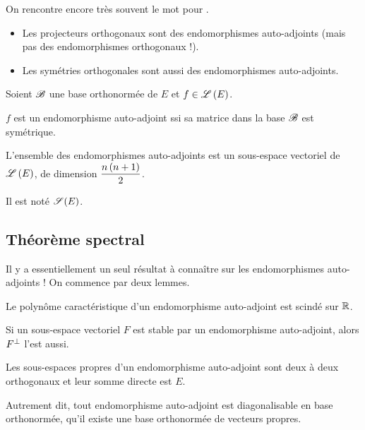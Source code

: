 On rencontre encore très souvent le mot  pour .

\begin{ex}
\begin{itemize}
    \item Les projecteurs orthogonaux sont des endomorphismes auto-adjoints (mais pas des endomorphismes orthogonaux !). \\
    \item Les symétries orthogonales sont aussi des endomorphismes auto-adjoints.
\end{itemize}
\end{ex}

\begin{prop}
Soient \(\mathscr{B}\) une base orthonormée de \(E\) et \(f\in\mathscr{L}\left(E\right)\).

\(f\) est un endomorphisme auto-adjoint ssi sa matrice dans la base \(\mathscr{B}\) est symétrique.
\end{prop}

\begin{cor}
L'ensemble des endomorphismes auto-adjoints est un sous-espace vectoriel de \(\mathscr{L}\left(E\right)\), de dimension \(\dfrac{n\left(n+1\right)}{2}\).
\end{cor}

Il est noté \(\sym{}[E]\).

\subsection{Théorème spectral}

Il y a essentiellement un seul résultat à connaître sur les endomorphismes auto-adjoints ! On commence par deux lemmes.

\begin{lem}
Le polynôme caractéristique d'un endomorphisme auto-adjoint est scindé sur \(\mathbb{R}\).
\end{lem}

\begin{lem}
Si un sous-espace vectoriel \(F\) est stable par un endomorphisme auto-adjoint, alors \(F^{\perp}\) l'est aussi.
\end{lem}

\begin{theo}
Les sous-espaces propres d'un endomorphisme auto-adjoint sont deux à deux orthogonaux et leur somme directe est \(E\).

Autrement dit, tout endomorphisme auto-adjoint est diagonalisable en base orthonormée, \cad qu'il existe une base orthonormée de vecteurs propres.
\end{theo}

